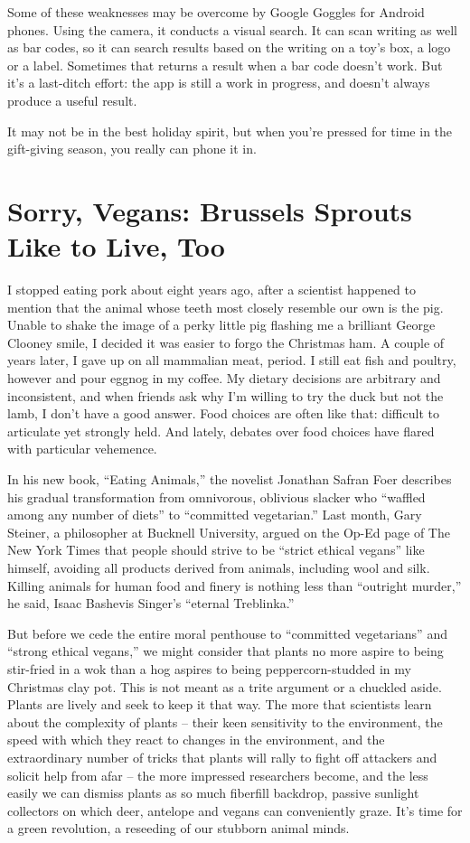 ﻿\documentclass[12pt]{article}
\begin{document}
Some of these weaknesses may be overcome by Google Goggles for Android phones. Using the camera, it
conducts a visual search. It can scan writing as well as bar codes, so it can search results based
on the writing on a toy's box, a logo or a label. Sometimes that returns a result when a bar code
doesn't work. But it's a last-ditch effort: the app is still a work in progress, and doesn't always
produce a useful result.

It may not be in the best holiday spirit, but when you're pressed for time in the gift-giving
season, you really can phone it in.

\section{Sorry, Vegans: Brussels Sprouts Like to Live, Too}

\lettrine{I}{} stopped eating pork about eight years ago, after a scientist
happened to mention that the animal whose teeth most closely resemble our own is the pig. Unable to
shake the image of a perky little pig flashing me a brilliant George Clooney smile, I decided it was
easier to forgo the Christmas ham. A couple of years later, I gave up on all mammalian meat, period.
I still eat fish and poultry, however and pour eggnog in my coffee. My dietary decisions are
arbitrary and inconsistent, and when friends ask why I'm willing to try the duck but not the lamb, I
don't have a good answer. Food choices are often like that: difficult to articulate yet strongly
held. And lately, debates over food choices have flared with particular vehemence.

In his new book, ``Eating Animals,'' the novelist Jonathan Safran Foer describes his gradual
transformation from omnivorous, oblivious slacker who ``waffled among any number of diets'' to
``committed vegetarian.'' Last month, Gary Steiner, a philosopher at Bucknell University, argued on
the Op-Ed page of The New York Times that people should strive to be ``strict ethical vegans'' like
himself, avoiding all products derived from animals, including wool and silk. Killing animals for
human food and finery is nothing less than ``outright murder,'' he said, Isaac Bashevis Singer's
``eternal Treblinka.''

But before we cede the entire moral penthouse to ``committed vegetarians'' and ``strong ethical
vegans,'' we might consider that plants no more aspire to being stir-fried in a wok than a hog
aspires to being peppercorn-studded in my Christmas clay pot. This is not meant as a trite argument
or a chuckled aside. Plants are lively and seek to keep it that way. The more that scientists learn
about the complexity of plants -- their keen sensitivity to the environment, the speed with which
they react to changes in the environment, and the extraordinary number of tricks that plants will
rally to fight off attackers and solicit help from afar -- the more impressed researchers become,
and the less easily we can dismiss plants as so much fiberfill backdrop, passive sunlight collectors
on which deer, antelope and vegans can conveniently graze. It's time for a green revolution, a
reseeding of our stubborn animal minds.
\end{document}
